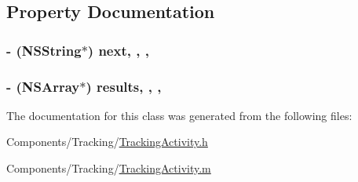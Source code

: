 \subsection{Property Documentation}
\hypertarget{interface_tracking_activity_a64cdd10b4b7470dd16c538a115540eaa}{
\subsubsection[{next}]{\setlength{\rightskip}{0pt plus 5cm}-\/ (N\-S\-String$\ast$) next\hspace{0.3cm}{\ttfamily [read]}, {\ttfamily [write]}, {\ttfamily [nonatomic]}, {\ttfamily [strong]}}}\label{interface_tracking_activity_a64cdd10b4b7470dd16c538a115540eaa}
\hypertarget{interface_tracking_activity_a6003c2eec97f88d0a029138a8045539f}{
\subsubsection[{results}]{\setlength{\rightskip}{0pt plus 5cm}-\/ (N\-S\-Array$\ast$) results\hspace{0.3cm}{\ttfamily [read]}, {\ttfamily [write]}, {\ttfamily [nonatomic]}, {\ttfamily [strong]}}}\label{interface_tracking_activity_a6003c2eec97f88d0a029138a8045539f}


The documentation for this class was generated from the following files\-:\begin{DoxyCompactItemize}
\item 
Components/\-Tracking/\hyperlink{_tracking_activity_8h}{Tracking\-Activity.\-h}\item 
Components/\-Tracking/\hyperlink{_tracking_activity_8m}{Tracking\-Activity.\-m}\end{DoxyCompactItemize}
